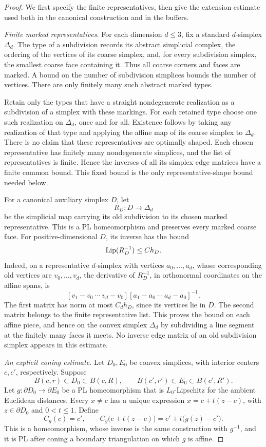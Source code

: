 \begin{proof}
We first specify the finite representatives, then give the extension
estimate used both in the canonical construction and in the buffers.

\emph{Finite marked representatives.}
For each dimension $d\leq 3$, fix a standard $d$-simplex $\Delta_d$.
The type of a subdivision records its abstract simplicial complex,
the ordering of the vertices of its coarse simplex, and, for every
subdivision simplex, the smallest coarse face containing it.
Thus all coarse corners and faces are marked.  A bound on the number
of subdivision simplices bounds the number of vertices.  There are
only finitely many such abstract marked types.

Retain only the types that have a straight nondegenerate realization
as a subdivision of a simplex with these markings.  For each retained
type choose one such realization on $\Delta_d$, once and for all.
Existence follows by taking any realization of that type and applying
the affine map of its coarse simplex to $\Delta_d$.  There is no
claim that these representatives are optimally shaped.  Each chosen
representative has finitely many nondegenerate simplices, and the
list of representatives is finite.  Hence the inverses of all its
simplex edge matrices have a finite common bound.  This fixed bound
is the only representative-shape bound needed below.

For a canonical auxiliary simplex $D$, let
\[
 R_D:D\longrightarrow\Delta_d
\]
be the simplicial map carrying its old subdivision to its chosen
marked representative.  This is a PL homeomorphism and preserves
every marked coarse face.  For positive-dimensional $D$, its inverse has the bound
\[
 \operatorname{Lip}(R_D^{-1})\leq C h_D.
\]
Indeed, on a representative $d$-simplex with vertices
$a_0,\ldots,a_d$, whose corresponding old vertices are
$v_0,\ldots,v_d$, the derivative of $R_D^{-1}$, in orthonormal
coordinates on the affine spans, is
\[
 [v_1-v_0\ \cdots\ v_d-v_0]
 [a_1-a_0\ \cdots\ a_d-a_0]^{-1}.
\]
The first matrix has norm at most $C_d h_D$, since its vertices lie
in $D$.  The second matrix belongs to the finite representative
list.  This proves the bound on each affine piece, and hence on
the convex simplex $\Delta_d$ by subdividing a line segment at the
finitely many faces it meets.  No inverse edge matrix of an old
subdivision simplex appears in this estimate.

\emph{An explicit coning estimate.}
Let $D_0,E_0$ be convex simplices, with interior centers $c,c'$,
respectively.  Suppose
\[
 B(c,r)\subset D_0\subset B(c,R),\qquad
 B(c',r')\subset E_0\subset B(c',R').
\]
Let $g:\partial D_0\to\partial E_0$ be a PL homeomorphism that is
$L_0$-Lipschitz for the ambient Euclidean distances.  Every
$x\ne c$ has a unique expression
$x=c+t(z-c)$, with $z\in\partial D_0$ and $0<t\leq 1$.
Define
\[
 C_g(c)=c',\qquad
 C_g\bigl(c+t(z-c)\bigr)=c'+t\bigl(g(z)-c'\bigr).
\]
This is a homeomorphism, whose inverse is the same construction
with $g^{-1}$, and it is PL after coning a boundary triangulation
on which $g$ is affine.


\end{proof}
